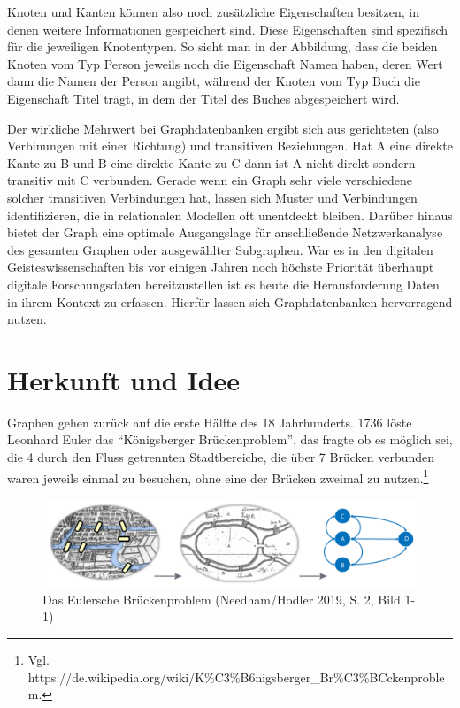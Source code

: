 \documentclass[ngerman,]{scrreprt}
\begin{document}
Knoten und Kanten können also noch zusätzliche Eigenschaften besitzen, in denen weitere Informationen gespeichert sind. Diese Eigenschaften sind spezifisch für die jeweiligen Knotentypen. So sieht man in der Abbildung, dass die beiden Knoten vom Typ Person jeweils noch die Eigenschaft Namen haben, deren Wert dann die Namen der Person angibt, während der Knoten vom Typ Buch die Eigenschaft Titel trägt, in dem der Titel des Buches abgespeichert wird.

Der wirkliche Mehrwert bei Graphdatenbanken ergibt sich aus gerichteten (also Verbinungen mit einer Richtung) und transitiven Beziehungen. Hat A eine direkte Kante zu B und B eine direkte Kante zu C dann ist A nicht direkt sondern transitiv mit C verbunden. Gerade wenn ein Graph sehr viele verschiedene solcher transitiven Verbindungen hat, lassen sich Muster und Verbindungen identifizieren, die in relationalen Modellen oft unentdeckt bleiben. Darüber hinaus bietet der Graph eine optimale Ausgangslage für anschließende Netzwerkanalyse des gesamten Graphen oder ausgewählter Subgraphen. War es in den digitalen Geisteswissenschaften bis vor einigen Jahren noch höchste Priorität überhaupt digitale Forschungsdaten bereitzustellen ist es heute die Herausforderung Daten in ihrem Kontext zu erfassen. Hierfür lassen sich Graphdatenbanken hervorragend nutzen.

\hypertarget{herkunft-und-idee}{%
\section{Herkunft und Idee}\label{herkunft-und-idee}}

Graphen gehen zurück auf die erste Hälfte des 18 Jahrhunderts. 1736 löste Leonhard Euler das ``Königsberger Brückenproblem'', das fragte ob es möglich sei, die 4 durch den Fluss getrennten Stadtbereiche, die über 7 Brücken verbunden waren jeweils einmal zu besuchen, ohne eine der Brücken zweimal zu nutzen.\footnote{Vgl. https://de.wikipedia.org/wiki/K\%C3\%B6nigsberger\_Br\%C3\%BCckenproblem.}

\begin{figure}
\centering
\includegraphics{Bilder/Eulersche-Bruecken.png}
\caption{Das Eulersche Brückenproblem (Needham/Hodler 2019, S. 2, Bild 1-1)}
\end{figure}
\end{document}
